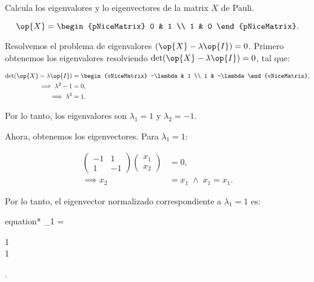 \documentclass[./../main.tex]{subfiles}
\begin{document}
\begin{problema}
	Calcula los eigenvalores y lo eigenvectores de la matrix \(X\) de Pauli.

	\begin{equation*}
		\op{X} = \begin{pNiceMatrix}
			0 & 1 \\
			1 & 0
		\end{pNiceMatrix}.
	\end{equation*}

	\startsolution

	Resolvemos el problema de eigenvalores \((\op{X} - \lambda\op{I}) = 0\). Primero obtenemos los eigenvalores resolviendo \(\det(\op{X} - \lambda\op{I}) = 0\), tal que:

	\begin{align*}
		\det(\op{X} - \lambda\op{I}) & = \begin{vNiceMatrix}
			                                 -\lambda & 1        \\
			                                 1        & -\lambda
		                                 \end{vNiceMatrix}, \\
		\implies \lambda^{2} - 1     & = 0,                  \\
		\implies \lambda^{2}         & = 1.
	\end{align*}

	Por lo tanto, los eigenvalores son \(\lambda_{1} = 1\) y \(\lambda_{2} = -1\).

	Ahora, obtenemos los eigenvectores. Para \(\lambda_{1} = 1\):

	\begin{align*}
		\begin{pmatrix}
			-1 & 1  \\
			1  & -1
		\end{pmatrix} \begin{pmatrix}
			              x_{1} \\
			              x_{2}
		              \end{pmatrix} & = 0,                                \\
		\implies x_{2}                & = x_{1}\; \wedge\; x_{1} = x_{1}.
	\end{align*}

	Por lo tanto, el eigenvector normalizado correspondiente a \(\lambda_{1} = 1\) es:

	\begin{empheq}[box=\resultbox]{equation*}
		_{1} = \begin{pmatrix}
			1 \\
			1
		\end{pmatrix}.
	\end{empheq}


\end{problema}
\end{document}
